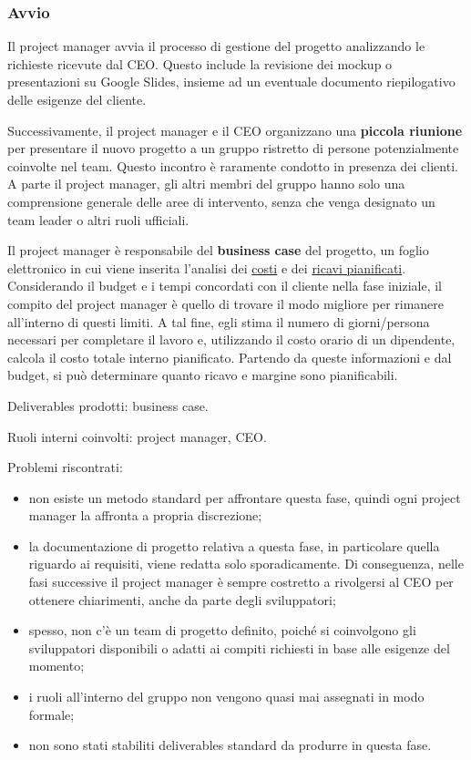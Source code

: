         \subsubsection{Avvio}
        Il project manager avvia il processo di gestione del progetto analizzando le richieste ricevute dal CEO. Questo include la
        revisione dei mockup o presentazioni su Google Slides, insieme ad un eventuale documento riepilogativo delle esigenze del cliente.

        Successivamente, il project manager e il CEO organizzano una \textbf{piccola riunione} per presentare il nuovo progetto a un gruppo
        ristretto di persone potenzialmente coinvolte nel team. Questo incontro è raramente condotto in presenza dei clienti. A parte
        il project manager, gli altri membri del gruppo hanno solo una comprensione generale delle aree di intervento, senza che venga designato un team leader o altri ruoli ufficiali.
        
        Il project manager è responsabile del \textbf{business case} del progetto, un foglio elettronico in cui viene inserita l'analisi dei \underline{costi}
        e dei \underline{ricavi pianificati}. Considerando il budget e i tempi concordati con il cliente nella fase iniziale, il compito del project manager
        è quello di trovare il modo migliore per rimanere all'interno di questi limiti. A tal fine, egli stima il numero di giorni/persona necessari
        per completare il lavoro e, utilizzando il costo orario di un dipendente, calcola il costo totale interno pianificato. Partendo da queste
        informazioni e dal budget, si può determinare quanto ricavo e margine sono pianificabili.

        Deliverables prodotti: business case.

        Ruoli interni coinvolti: project manager, CEO.

        Problemi riscontrati:
        \begin{itemize}
            \item non esiste un metodo standard per affrontare questa fase, quindi ogni project manager la affronta a propria discrezione;
            \item la documentazione di progetto relativa a questa fase, in particolare quella riguardo ai requisiti, viene redatta solo sporadicamente.
            Di conseguenza, nelle fasi successive il project manager è sempre costretto a rivolgersi al CEO per ottenere chiarimenti, anche da parte degli sviluppatori;
            \item spesso, non c’è un team di progetto definito, poiché si coinvolgono gli sviluppatori disponibili o adatti ai compiti richiesti in base alle esigenze del momento;
            \item i ruoli all'interno del gruppo non vengono quasi mai assegnati in modo formale;            
            \item non sono stati stabiliti deliverables standard da produrre in questa fase.
        \end{itemize}

